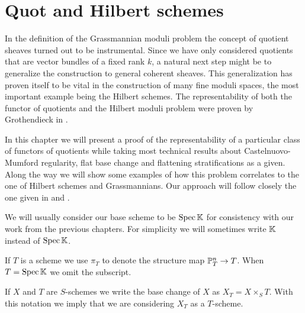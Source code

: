 \chapter{Quot and Hilbert schemes}
In the definition of the Grassmannian moduli problem the concept of quotient sheaves turned out to be instrumental. 
Since we have only considered quotients that are vector bundles of a fixed rank $k$, a natural next step might be to generalize the construction to general coherent sheaves. 
This generalization has proven itself to be vital in the construction of many fine moduli spaces, the most important example being the Hilbert schemes. 
The representability of both the functor of quotients and the Hilbert moduli problem were proven by Grothendieck in \cite{FGAVI}.

In this chapter we will present a proof of the representability of a particular class of functors of quotients while taking most technical results about Castelnuovo-Mumford regularity, flat base change and flattening stratifications as a given. 
Along the way we will show some examples of how this problem correlates to the one of Hilbert schemes and Grassmannians. Our approach will follow closely the one given in \cite{Alper} and \cite{FGAEXPLAINED}.\smallskip

We will usually consider our base scheme to be $\mathrm{Spec}\, \mathbb{K}$ for consistency with our work from the previous chapters.
For simplicity we will sometimes write $\mathbb{K}$ instead of $\mathrm{Spec}\, \mathbb{K}$.
\begin{notation}
If $T$ is a scheme we use $\pi_T$ to denote the structure map $\mathbb{P}^n_T\to T$. When $T=\mathrm{Spec}\,\mathbb{K}$ we omit the subscript.
\end{notation}

\begin{notation}
If $X$ and $T$ are $S$-schemes we write the base change of $X$ as $X_T=X\times_S T$. With this notation we imply that we are considering $X_T$ as a $T$-scheme.
\end{notation}


